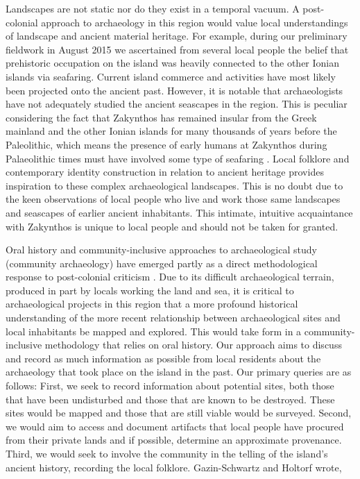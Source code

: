 Landscapes are not static nor do they exist in a temporal vacuum. A post-colonial approach to archaeology in this region would value local understandings of landscape and ancient material heritage. For example, during our preliminary fieldwork in August 2015 we ascertained from several local people the belief that prehistoric occupation on the island was heavily connected to the other Ionian islands via seafaring. Current island commerce and activities have most likely been projected onto the ancient past. However, it is notable that archaeologists have not adequately studied the ancient seascapes in the region. This is peculiar considering the fact that Zakynthos has remained insular from the Greek mainland and the other Ionian islands for many thousands of years before the Paleolithic, which means the presence of early humans at Zakynthos during Palaeolithic times must have involved some type of seafaring \parencite{Ferentinos_2012}. Local folklore and contemporary identity construction in relation to ancient heritage provides inspiration to these complex archaeological landscapes. This is no doubt due to the keen observations of local people who live and work those same landscapes and seascapes of earlier ancient inhabitants. This intimate, intuitive acquaintance with Zakynthos is unique to local people and should not be taken for granted. 
	
Oral history and community-inclusive approaches to archaeological study (community archaeology) have emerged partly as a direct methodological response to post-colonial criticism \parencites{Smith_2005}{Hill_2011}{McNiven_2005}{Lyons_2013}{Lavin_2013}. Due to its difficult archaeological terrain, produced in part by locals working the land and sea, it is critical to archaeological projects in this region that a more profound historical understanding of the more recent relationship between archaeological sites and local inhabitants be mapped and explored. This would take form in a community-inclusive methodology that relies on oral history. Our approach aims to discuss and record as much information as possible from local residents about the archaeology that took place on the island in the past. Our primary queries are as follows: First, we seek to record information about potential sites, both those that have been undisturbed and those that are known to be destroyed. These sites would be mapped and those that are still viable would be surveyed. Second, we would aim to access and document artifacts that local people have procured from their private lands and if possible, determine an approximate provenance. Third, we would seek to involve the community in the telling of the island’s ancient history, recording the local folklore. Gazin-Schwartz and Holtorf wrote,

